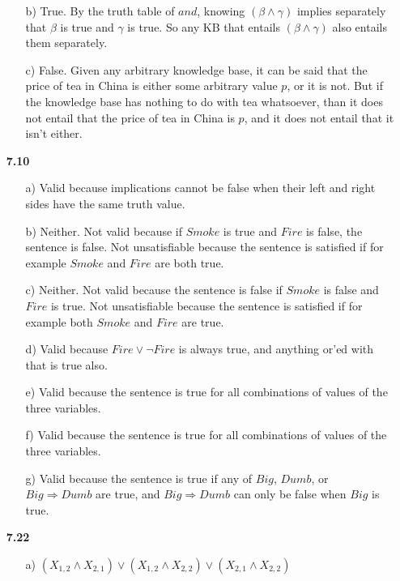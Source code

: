 \documentclass{article}
\begin{document}
\begin{enumerate}
\begin{enumerate}
\item[b)]
True. By the truth table of $and$, knowing $(\beta \wedge \gamma)$ implies separately
that $\beta$ is true and $\gamma$ is true. So any KB that entails $(\beta \wedge
\gamma)$ also entails them separately.

\item[c)]
False. Given any arbitrary knowledge base, it can be said that the price of tea in
China is either some arbitrary value $p$, or it is not. But if the knowledge base has nothing to do
with tea whatsoever, than it does not entail that the price of tea in China is
$p$, and it does not entail that it isn't either.

\end{enumerate}

\item[\textbf{7.10}]
\begin{enumerate}
\item[a)]
Valid because implications cannot be false when their left and right sides have
the same truth value.

\item[b)]
Neither. Not valid because if $Smoke$ is true and $Fire$ is false, the
sentence is false. Not unsatisfiable because the sentence is satisfied if for
example $Smoke$ and $Fire$ are both true.

\item[c)]
Neither. Not valid because the sentence is false if $Smoke$ is false and $Fire$
is true. Not unsatisfiable because the sentence is satisfied if for example
both $Smoke$ and $Fire$ are true.

\item[d)]
Valid because $Fire \vee \neg Fire$ is always true, and anything or'ed with
that is true also.

\item[e)]
Valid because the sentence is true for all combinations of values of the three
variables.

\item[f)]
Valid because the sentence is true for all combinations of values of the three
variables.

\item[g)]
Valid because the sentence is true if any of $Big$, $Dumb$, or $Big \Rightarrow
Dumb$ are true, and $Big \Rightarrow Dumb$ can only be false when $Big$ is true.
\end{enumerate}

\item[\textbf{7.22}]
\begin{enumerate}
\item[a)]
$(X_{1,2} \wedge X_{2,1}) \vee (X_{1,2} \wedge X_{2,2}) \vee (X_{2,1} \wedge X_{2,2})$


\end{enumerate}
\end{enumerate}
\end{document}
